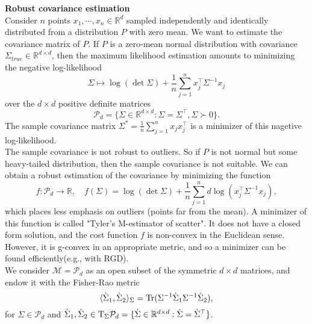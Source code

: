 \documentclass[en, oneside]{assignment}
\begin{document}
\begin{prob} \textbf{Robust covariance estimation}\\
    Consider $n$ points $x_1, \cdots, x_n \in \mathbb R^d$ sampled independently and identically distributed from a distribution $P$ with zero mean.
    We want to estimate the covariance matrix of $P$. If $P$ is a zero-mean normal distribution with covariance $\Sigma_{true} \in \mathbb R^{d \times d}$, 
    then the maximum likelihood estimation amounts to minimizing the negative log-likelihood
    \begin{equation*}
        \Sigma \mapsto \log (\det \Sigma) + \frac{1}{n} \sum_{j=1}^n x_j^\top \Sigma^{-1} x_j
    \end{equation*}
    over the $d \times d$ positive definite matrices
    \begin{equation*}
        \mathcal P_d = \{\Sigma \in \mathbb R^{d \times d} : \Sigma = \Sigma^\top, \Sigma \succ 0\}.
    \end{equation*}
    The sample covariance matrix $\Sigma^* = \frac{1}{n} \sum_{j=1}^n x_j x_j^\top$ is a minimizer of this nagetive log-likelihood.\\
    The sample covariance is not robust to outliers. So if $P$ is not normal but some heavy-tailed distribution, then the sample covariance is not suitable. 
    We can obtain a robust estimation of the covariance by minimizing the function
    \begin{equation*}
        f: \mathcal P_d \rightarrow \mathbb R, \quad f(\Sigma) = \log (\det \Sigma) + \frac{1}{n} \sum_{j=1}^n d \log (x_j^\top \Sigma^{-1} x_j),
    \end{equation*}
    which places less emphasis on outliers (points far from the mean). A minimizer of this function is called "Tyler's M-estimator of scatter".
    It does not have a closed form solution, and the cost function $f$ is non-convex in the Euclidean sense.
    However, it is g-convex in an appropriate metric, and so a minimizer can be found efficiently(e.g., with RGD).\\
    We consider $\mathcal M = \mathcal P_d$ as an open subset of the symmetric $d \times d$ matrices, and endow it with the Fisher-Rao metric
    \begin{equation*}
        \langle \dot \Sigma _1, \dot \Sigma _2 \rangle_{\Sigma} = \operatorname{Tr} (\Sigma^{-1} \dot \Sigma _1 \Sigma^{-1} \dot \Sigma _2), 
    \end{equation*}
    for $\Sigma \in \mathcal P_d$ and $\dot \Sigma _1, \dot \Sigma _2 \in \text T _\Sigma \mathcal P_d = \{ \dot \Sigma \in \mathbb R^{d \times d} : \dot \Sigma = \dot \Sigma^\top\}$.

\end{prob}
\end{document}
